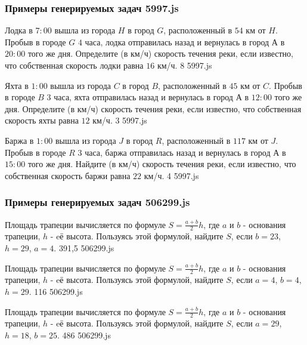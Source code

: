 
\subsubsection*{Примеры генерируемых задач 5997.js}   

\par{Лодка в $7:00$ вышла из города $H$ в город $G$, расположенный в $54$ км от $H$. Пробыв в городе $G$ $4$ часа, лодка отправилась назад и вернулась в город $А$ в $20:00$ того же дня. Определите (в км/ч) скорость течения реки, если известно, что собственная скорость лодки равна $16$ км/ч. }{ 8 }{5997.js}
\par{Яхта в $1:00$ вышла из города $C$ в город $B$, расположенный в $45$ км от $C$. Пробыв в городе $B$ $3$ часа, яхта отправилась назад и вернулась в город $А$ в $12:00$ того же дня. Определите (в км/ч) скорость течения реки, если известно, что собственная скорость яхты равна $12$ км/ч. }{ 3 }{5997.js}
\par{Баржа в $1:00$ вышла из города $J$ в город $R$, расположенный в $117$ км от $J$. Пробыв в городе $R$ $3$ часа, баржа отправилась назад и вернулась в город $А$ в $15:00$ того же дня. Найдите (в км/ч) скорость течения реки, если известно, что собственная скорость баржи равна $22$ км/ч. }{ 4 }{5997.js}	


\subsubsection*{Примеры генерируемых задач 506299.js}   

\par{Площадь трапеции вычисляется по формуле $S=\frac{a+b}{2}h$, где $a$ и $b$ - основания трапеции, $h$ - eё высота. Пользуясь этой формулой, найдите $S$, если $b=23$, $h=29$, $a=4$. }{ 391,5 }{506299.js}
\par{Площадь трапеции вычисляется по формуле $S=\frac{a+b}{2}h$, где $a$ и $b$ - основания трапеции, $h$ - eё высота. Пользуясь этой формулой, найдите $S$, если $a=4$, $b=4$, $h=29$. }{ 116 }{506299.js}
\par{Площадь трапеции вычисляется по формуле $S=\frac{a+b}{2}h$, где $a$ и $b$ - основания трапеции, $h$ - eё высота. Пользуясь этой формулой, найдите $S$, если $a=29$, $h=18$, $b=25$. }{ 486 }{506299.js}


